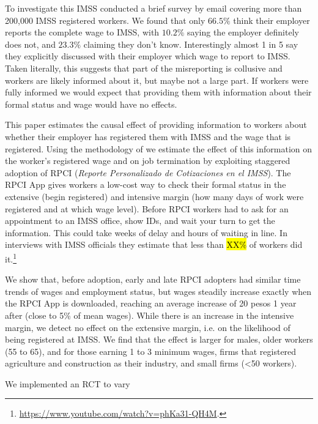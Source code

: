 \documentclass[oneside,11pt]{article}
\begin{document}
To investigate this IMSS conducted a brief survey by email covering more than 200,000 IMSS registered workers. We found that only $66.5\%$ think their employer reports the complete wage to IMSS, with $10.2\%$ saying the employer definitely does not, and $23.3\%$ claiming they don't know. Interestingly almost 1 in 5 say they explicitly discussed with their employer which wage to report to IMSS. Taken literally, this suggests that part of the misreporting is collusive and workers are likely informed about it, but maybe not a large part. If workers were fully informed we would expect that providing them with information about their formal status and wage would have no effects. 

This paper estimates the causal effect of providing information to workers about whether their employer has registered them with IMSS and the wage that is registered. Using the methodology of \cite{deChaisemartin2022} we estimate the effect of this information on the worker's registered wage and on job termination by exploiting staggered adoption of RPCI (\textit{Reporte Personalizado de Cotizaciones en el IMSS}). The RPCI App gives workers a low-cost way to check their formal status in the extensive (begin registered) and intensive margin (how many days of work were registered and at which wage level). Before RPCI workers had to ask for an appointment to an IMSS office, show IDs, and wait your turn to get the information. This could take weeks of delay and hours of waiting in line. In interviews with IMSS officials they estimate that less than \hl{XX\%} of workers did it.\footnote{\url{https://www.youtube.com/watch?v=phKa31-QH4M}.}

We show that, before adoption, early and late RPCI adopters had similar time trends of wages and employment status, but wages steadily increase exactly when the RPCI App is downloaded, reaching an average increase of 20 pesos 1 year after (close to 5\% of mean wages). While there is an increase in the intensive margin, we detect no effect on the extensive margin, i.e. on the likelihood of being registered at IMSS. We find that the effect is larger for males, older workers (55 to 65), and for those earning 1 to 3 minimum wages, firms that registered agriculture and construction as their industry, and small firms (<50 workers).

We implemented an RCT to vary 






\end{document}
